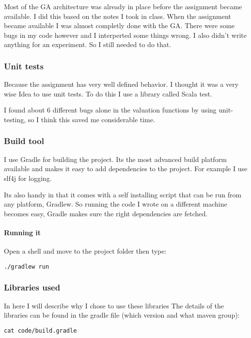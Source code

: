 \documentclass{article}
\begin{document}
\begin{empfile}
\clearpage


Most of the GA architecture was already in place before the assignment became
available. I did this based on the notes I took in class. When the assignment
became available I was almost completly done with the GA{.} There were some bugs
in my code however and I interperted some things wrong. I also didn't write
anything for an experiment. So I still needed to do that.

\subsubsection{Unit tests}
Because the assignment has very well defined behavior. I thought it was
a very wise Idea to use unit tests. To do this I use a library called
Scala test.

I found about 6 different bugs alone in the valuation functions by using 
unit-testing, so I think this saved me considerable time.
\subsubsection{Build tool}
I use Gradle for building the project. Its the most advanced build platform
available and makes it easy to add dependencies to the project.
For example I use slf4j for logging.

Its also handy in that it comes with a self installing script that can be run
from any platform, Gradlew. So running the code I wrote on a different machine
becomes easy, Gradle makes sure the right dependencies are fetched.

\paragraph{Running it}

Open a shell and move to the project folder then type:

\lstset{language=Bash}
\begin{lstlisting}[frame=single]
	./gradlew run
\end{lstlisting}

\subsubsection{Libraries used}
In here I will describe why I chose to use these libraries
The details of the libraries can be found in the gradle file (which
version and what maven group):

\begin{lstlisting}[frame=single]
	cat code/build.gradle
\end{lstlisting}



\end{empfile}
\end{document}
